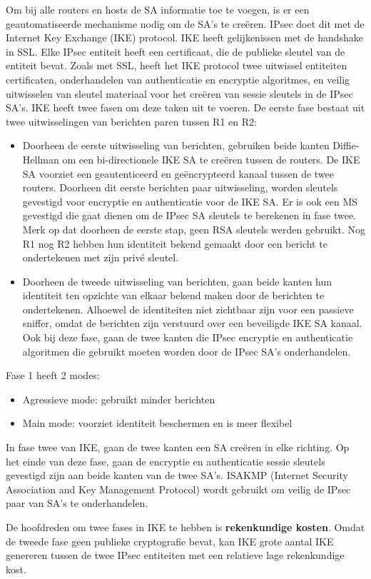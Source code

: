 Om bij alle routers en hosts de SA informatie toe te voegen, is er een geautomatiseerde mechanisme nodig om de SA’s te creëren. IPsec doet dit met de Internet Key Exchange (IKE) protocol. IKE heeft gelijkenissen met de handshake in SSL. Elke IPsec entiteit heeft een certificaat, die de publieke sleutel van de entiteit bevat. Zoals met SSL, heeft het IKE protocol twee uitwissel entiteiten certificaten, onderhandelen van authenticatie en encryptie algoritmes, en veilig uitwisselen van sleutel materiaal voor het creëren van sessie sleutels in de IPsec SA’s.
IKE heeft twee fasen om deze taken uit te voeren. De eerste fase bestaat uit twee uitwisselingen van berichten paren tussen R1 en R2:
\begin{itemize}
\item Doorheen de eerste uitwisseling van berichten, gebruiken beide kanten Diffie-Hellman om een bi-directionele IKE SA te creëren tussen de routers. De IKE SA voorziet een geautenticeerd en geëncrypteerd kanaal tussen de twee routers. 
Doorheen dit eerste berichten paar uitwisseling, worden sleutels gevestigd voor encryptie en authenticatie voor de IKE SA. Er is ook een MS gevestigd die gaat dienen om de IPsec SA sleutels te berekenen in fase twee.
Merk op dat doorheen de eerste stap, geen RSA sleutels werden gebruikt. Nog R1 nog R2 hebben hun identiteit bekend gemaakt door een bericht te ondertekenen met zijn privé sleutel.
\item Doorheen de tweede uitwisseling van berichten, gaan beide kanten hun identiteit ten opzichte van elkaar bekend maken door de berichten te ondertekenen. Alhoewel de identiteiten niet zichtbaar zijn voor een passieve sniffer, omdat de berichten zijn verstuurd over een beveiligde IKE SA kanaal. Ook bij deze fase, gaan de twee kanten die IPsec encryptie en authenticatie algoritmen die gebruikt moeten worden door de IPsec SA’s onderhandelen.
\end{itemize}

\noindent Fase 1 heeft 2 modes:
\begin{itemize}
\item Agressieve mode: gebruikt minder berichten
\item Main mode: voorziet identiteit beschermen en is meer flexibel
\end{itemize}

\noindent In fase twee van IKE, gaan de twee kanten een SA creëren in elke richting. Op het einde van deze fase, gaan de encryptie en authenticatie sessie sleutels gevestigd zijn aan beide kanten van de twee SA’s. ISAKMP (Internet Security Association and Key Management Protocol) wordt gebruikt om veilig de IPsec paar van SA’s te onderhandelen.

\noindent De hoofdreden om twee fases in IKE te hebben is \textbf{rekenkundige kosten}. Omdat de tweede fase geen publieke cryptografie bevat, kan IKE grote aantal IKE genereren tussen de twee IPsec entiteiten met een relatieve lage rekenkundige kost.
